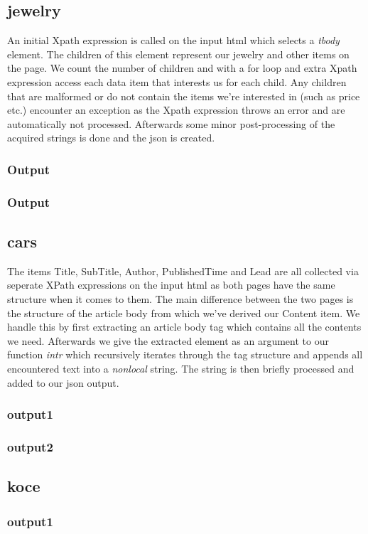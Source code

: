 \documentclass[runningheads]{llncs}
\begin{document}
\subsection{jewelry}
An initial Xpath expression is called on the input html which selects a \textit{tbody} element. The children of this element represent our jewelry and other items on the page. We count the number of children and with a for loop and extra Xpath expression access each data item that interests us for each child. Any children that are malformed or do not contain the items we're interested in (such as price etc.) encounter an exception as the Xpath expression throws an error and are automatically not processed. Afterwards some minor post-processing of the acquired strings is done and the json is created.
\subsubsection{Output}
\subsubsection{Output}

\subsection{cars}
The items Title, SubTitle, Author, PublishedTime and Lead are all collected via seperate XPath expressions on the input html as both pages have the same structure when it comes to them. The main difference between the two pages is the structure of the article body from which we've derived our Content item. We handle this by first extracting an article body tag which contains all the contents we need. Afterwards we give the extracted element as an argument to our function \textit{intr} which recursively iterates through the tag structure and appends all encountered text into a \textit{nonlocal} string. The string is then briefly processed and added to our json output.
\subsubsection{output1}
\subsubsection{output2}
\subsection{koce}
\subsubsection{output1}
\end{document}
